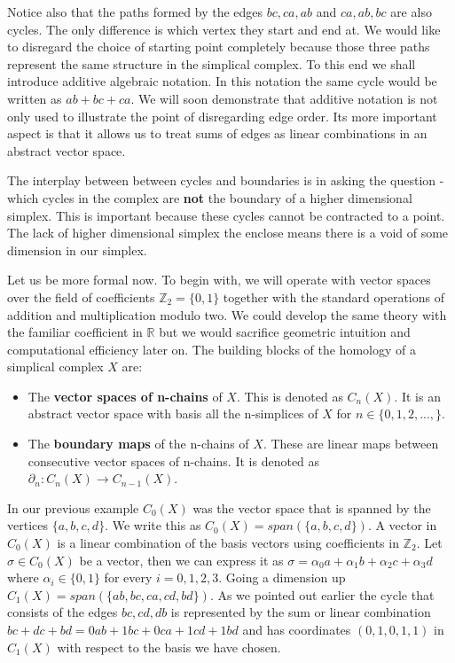 Notice also that the paths formed by the edges $bc, ca, ab$ and $ca, ab, bc$ are also cycles. The only difference is which vertex they start and end at. We would like to disregard the choice of starting point completely because those three paths represent the same structure in the simplical complex. To this end we shall introduce additive algebraic notation. In this notation the same cycle would be written as $ab + bc + ca$.  We will soon demonstrate that additive notation is not only used to illustrate the point of disregarding edge order. Its more important aspect is that it allows us to treat sums of edges as linear combinations in an abstract vector space.

The interplay between between cycles and boundaries is in asking the question - which cycles in the complex are \textbf{not} the boundary of a higher dimensional simplex. This is important because these cycles cannot be contracted to a point. The lack of higher dimensional simplex the enclose means there is a void of some dimension in our simplex.

Let us be more formal now. To begin with, we will operate with vector spaces over the field of coefficients $\mathbb{Z}_2 = \{0, 1\}$ together with the standard operations of addition and multiplication modulo two. We could develop the same theory with the familiar coefficient in $\mathbb{R}$ but we would sacrifice geometric intuition and computational efficiency later on. The building blocks of the homology of a simplical complex $X$ are:


\begin{itemize}
    \item The \textbf{vector spaces of n-chains} of $X$. This is denoted as $C_n(X)$. It is an abstract vector space with basis all the n-simplices of $X$ for $n \in \{0, 1, 2, ..., \}$.
    \item The \textbf{boundary maps} of the n-chains of $X$. These are linear maps between consecutive vector spaces of n-chains. It is denoted as $\partial_n : C_n(X) \to C_{n-1}(X)$.
\end{itemize}

In our previous example $C_0(X)$ was the vector space that is spanned by the vertices $\{a, b, c, d\}$. We write this as $C_0(X) = span(\{a, b, c, d\})$. A vector in $C_0(X)$ is a linear combination of the basis vectors using coefficients in $\mathbb{Z}_2$. Let $\sigma \in C_0(X)$ be a vector, then we can express it as $\sigma  = \alpha_0a + \alpha_1b + \alpha_2c + \alpha_3d$ where $\alpha_i \in \{0 ,1\}$ for every $i = 0, 1, 2, 3$. Going a dimension up $C_1(X) = span(\{ab, bc, ca, cd, bd\})$. As we pointed out earlier the cycle that consists of the edges $bc, cd, db$ is represented by the sum or linear combination $bc + dc + bd = 0ab + 1bc + 0ca + 1cd + 1bd$ and has coordinates $(0, 1, 0, 1, 1)$ in $C_1(X)$ with respect to the basis we have chosen.


